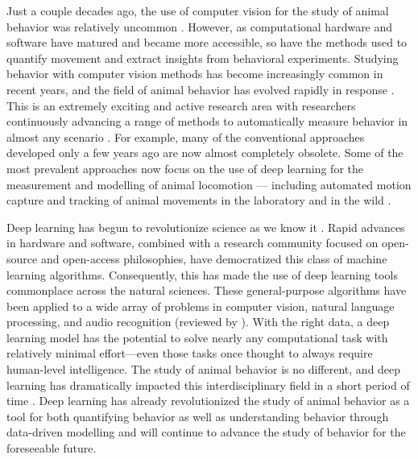 \documentclass[11pt,a4paper,oneside]{book}
\begin{document}
\begin{doublespace}
Just a couple decades ago, the use of computer vision for the study of animal behavior was relatively uncommon \citep{dell2014automated}. However, as computational hardware and software have matured and became more accessible, so have the methods used to quantify movement and extract insights from behavioral experiments. Studying behavior with computer vision methods has become increasingly common in recent years, and the field of animal behavior has evolved rapidly in response \citep{anderson2014toward, berman2018measuring, brown2018ethology}. This is an extremely exciting and active research area with researchers continuously advancing a range of methods to automatically measure behavior in almost any scenario \citep{dell2014automated, anderson2014toward, graving2019deepposekit, mathis2020deep}. For example, many of the conventional approaches developed only a few years ago are now almost completely obsolete. Some of the most prevalent approaches now focus on the use of deep learning for the measurement and modelling of animal locomotion \citep{graving2019deepposekit, mathis2020deep, luxem2020identifying, graving2020vae} --- including automated motion capture and tracking of animal movements in the laboratory and in the wild \citep{nath2018, graving2019deepposekit, francisco2020high}. 

Deep learning has begun to revolutionize science as we know it \citep{lecun2015deep}. Rapid advances in hardware and software, combined with a research community focused on open-source and open-access philosophies, have democratized this class of machine learning algorithms. Consequently, this has made the use of deep learning tools commonplace across the natural sciences. These general-purpose algorithms have been applied to a wide array of problems in computer vision, natural language processing, and audio recognition (reviewed by \citealt{lecun2015deep}). With the right data, a deep learning model has the potential to solve nearly any computational task with relatively minimal effort---even those tasks once thought to always require human-level intelligence. The study of animal behavior is no different, and deep learning has dramatically impacted this interdisciplinary field in a short period of time \citep{graving2019deepposekit, mathis2020deep}. Deep learning has already revolutionized the study of animal behavior as a tool for both quantifying behavior \citep{mathis2018deeplabcut, pereira2019fast, romero2018idtracker, graving2019deepposekit} as well as understanding behavior through data-driven modelling \citep{johnson2016composing, luxem2020identifying, graving2020vaesne} and will continue to advance the study of behavior for the foreseeable future. 


\end{doublespace}
\end{document}
